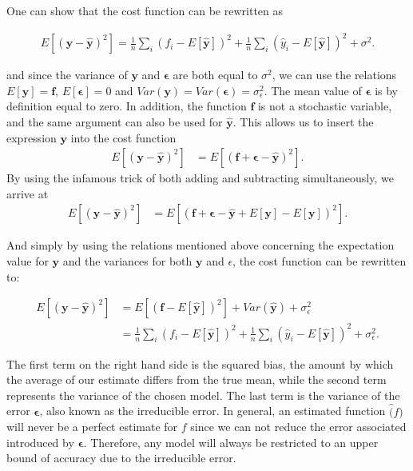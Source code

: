 One can show that the cost function can be rewritten as


\begin{align*}
E\left[(\boldsymbol{y}-\boldsymbol{\hat{y}})^2\right]=\frac{1}{n}\sum_i(f_i- E\left[\boldsymbol{\hat{y}}\right])^2+\frac{1}{n}\sum_i(\hat{y}_i- E\left[\boldsymbol{\hat{y}}\right])^2+\sigma^2.
\end{align*}

and since the variance of $\boldsymbol{y}$ and $\boldsymbol{\epsilon}$ are both equal to $\sigma^2$, we can use the relations $E[\boldsymbol{y}] = \boldsymbol{f}$, $ E[\boldsymbol{\epsilon}] = 0 $ and $Var(\boldsymbol{y}) = Var(\boldsymbol{\epsilon}) = \sigma_{\epsilon}^2$. The mean value of $\boldsymbol{\epsilon}$ is by definition equal to zero. In addition, the function $\boldsymbol{f}$ is not a stochastic variable, and the same argument can also be used for $\boldsymbol{\hat{y}}$. This allows us to insert the expression $\boldsymbol{y}$ into the cost function
\begin{align*}
E[(\boldsymbol{y-\hat{y}})^2] &= E[(\boldsymbol{f + \epsilon - \hat{y}})^2].
\end{align*}
By using the infamous trick of both adding and subtracting simultaneously, we arrive at
\begin{align*}
E\left[(\boldsymbol{y}-\boldsymbol{\hat{y}})^2\right] &= E[(\boldsymbol{f + \epsilon - \hat{y}} + E[\boldsymbol{y}] - E[\boldsymbol{y}])^2 ].
\end{align*}

And simply by using the relations mentioned above concerning the expectation value for $\boldsymbol{y}$ and the variances for both $\boldsymbol{y}$ and $\epsilon$, the cost function can be rewritten to:

\begin{align*}
E\left[(\boldsymbol{y}-\boldsymbol{\hat{y}})^2\right] &=  E[(\boldsymbol{f}-E[\boldsymbol{\hat{y}}])^2] + Var(\boldsymbol{\hat{y}}) + \sigma_{\epsilon}^2 \\
 &= \frac{1}{n}\sum_i(f_i- E\left[\boldsymbol{\hat{y}}\right])^2+\frac{1}{n}\sum_i(\hat{y}_i- E\left[\boldsymbol{\hat{y}}\right])^2+\sigma^2_{\epsilon}.
\end{align*}

The first term on the right hand side is the squared bias, the amount by which the average of our estimate differs from the true mean, while the second term represents the variance of the chosen model. The last term is the variance of the error $\boldsymbol{\epsilon}$, also known as the irreducible error. In general, an estimated function $\hat(f)$ will never be a perfect estimate for $f$ since we can not reduce the error associated introduced by $\boldsymbol{\epsilon}$. Therefore, any model will always be restricted to an upper bound of accuracy due to the irreducible error.

